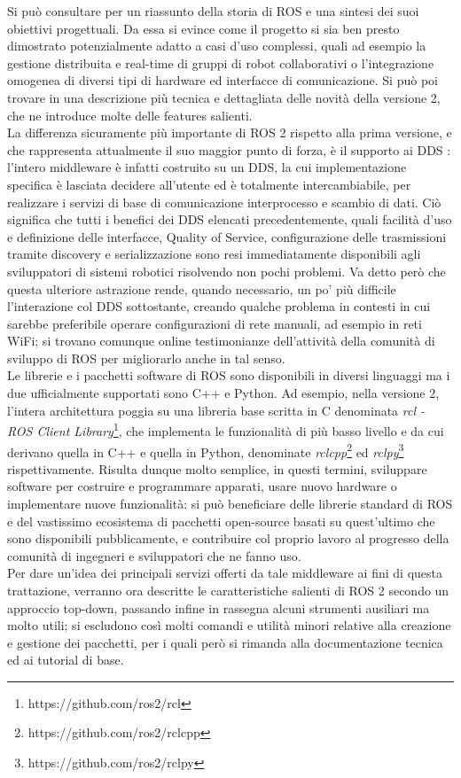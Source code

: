 Si può consultare \cite{why_ros2} per un riassunto della storia di ROS e una sintesi dei suoi obiettivi progettuali. Da essa si evince come il progetto si sia ben presto dimostrato potenzialmente adatto a casi d'uso complessi, quali ad esempio la gestione distribuita e real-time di gruppi di robot collaborativi o l'integrazione omogenea di diversi tipi di hardware ed interfacce di comunicazione. Si può poi trovare in \cite{ros2_changes} una descrizione più tecnica e dettagliata delle novità della versione 2, che ne introduce molte delle features salienti.\\
La differenza sicuramente più importante di ROS 2 rispetto alla prima versione, e che rappresenta attualmente il suo maggior punto di forza, è il supporto ai DDS \cite{ros2_dds}: l’intero middleware è infatti costruito su un DDS, la cui implementazione specifica è lasciata decidere all’utente ed è totalmente intercambiabile, per realizzare i servizi di base di comunicazione interprocesso e scambio di dati. Ciò significa che tutti i benefici dei DDS elencati precedentemente, quali facilità d'uso e definizione delle interfacce, Quality of Service, configurazione delle trasmissioni tramite discovery e serializzazione sono resi immediatamente disponibili agli sviluppatori di sistemi robotici risolvendo non pochi problemi. Va detto però che questa ulteriore astrazione rende, quando necessario, un po' più difficile l'interazione col DDS sottostante, creando qualche problema in contesti in cui sarebbe preferibile operare configurazioni di rete manuali, ad esempio in reti WiFi; si trovano comunque online testimonianze dell'attività della comunità di sviluppo di ROS per migliorarlo anche in tal senso.\\
Le librerie e i pacchetti software di ROS sono disponibili in diversi linguaggi ma i due ufficialmente supportati sono C++ e Python. Ad esempio, nella versione 2, l'intera architettura poggia su una libreria base scritta in C denominata \emph{rcl - ROS Client Library}\footnote{https://github.com/ros2/rcl}, che implementa le funzionalità di più basso livello e da cui derivano quella in C++ e quella in Python, denominate \emph{rclcpp}\footnote{https://github.com/ros2/rclcpp} ed \emph{rclpy}\footnote{https://github.com/ros2/rclpy} rispettivamente. Risulta dunque molto semplice, in questi termini, sviluppare software per costruire e programmare apparati, usare nuovo hardware o implementare nuove funzionalità: si può beneficiare delle librerie standard di ROS e del vastissimo ecosistema di pacchetti open-source basati su quest'ultimo che sono disponibili pubblicamente, e contribuire col proprio lavoro al progresso della comunità di ingegneri e sviluppatori che ne fanno uso.\\
Per dare un'idea dei principali servizi offerti da tale middleware ai fini di questa trattazione, verranno ora descritte le caratteristiche salienti di ROS 2 secondo un approccio top-down, passando infine in rassegna alcuni strumenti ausiliari ma molto utili; si escludono così molti comandi e utilità minori relative alla creazione e gestione dei pacchetti, per i quali però si rimanda alla documentazione tecnica ed ai tutorial di base.\vfill\newpage


